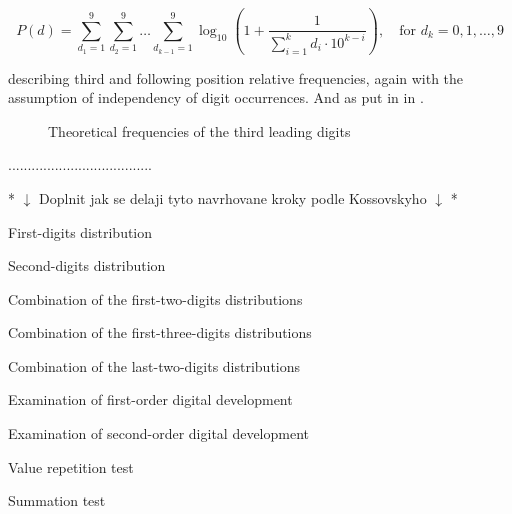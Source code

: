 \begin{equation}
    P(d) = \sum\limits_{d_1=1}^{9} \sum\limits_{d_2=1}^{9} \dots \sum\limits_{d_{k-1}=1}^{9}   \log_{10}\left( 1+\frac{1}{\sum\limits_{i=1}^{k} d_i \cdot 10^{k-i} }\right), \quad \text{for } d_k = 0,1,\dots,9 
\end{equation}

describing third and following position relative frequencies, again with the assumption of independency of digit occurrences. And  as put in \citeauthor{Hronova2023} in \citeyear{Hronova2023}. 

\begin{figure}[ht]
    \centering
    \caption{Theoretical frequencies of the third leading digits}  
    \label{fig:third-digit-law}
    \pgfplotsset{width=8.5cm,compat=1.18}
\end{figure}




\begin{koment}
.....................................

* $\downarrow$ Doplnit jak se delaji tyto navrhovane kroky podle Kossovskyho $\downarrow$ *

First-digits distribution

Second-digits distribution

Combination of the first-two-digits distributions

Combination of the first-three-digits distributions

Combination of the last-two-digits distributions 

Examination of first-order digital development

Examination of second-order digital development

Value repetition test

Summation test  
\end{koment}



